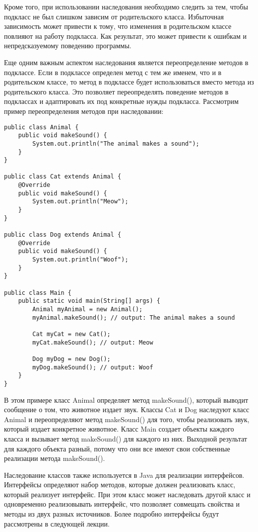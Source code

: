 \documentclass[12pt, a4paper]{book}%
\begin{document}
{Кроме того, при использовании наследования необходимо следить за тем, чтобы подкласс не был слишком зависим от родительского класса. Избыточная зависимость может привести к тому, что изменения в родительском классе повлияют на работу подкласса. Как результат, это может привести к ошибкам и непредсказуемому поведению программы.

Еще одним важным аспектом наследования является переопределение методов в подклассе. Если в подклассе определен метод с тем же именем, что и в родительском классе, то метод в подклассе будет использоваться вместо метода из родительского класса. Это позволяет переопределять поведение методов в подклассах и адаптировать их под конкретные нужды подкласса.
Рассмотрим пример переопределения методов при наследовании:

\begin{lstlisting}
public class Animal {
    public void makeSound() {
        System.out.println("The animal makes a sound");
    }
}

public class Cat extends Animal {
    @Override
    public void makeSound() {
        System.out.println("Meow");
    }
}

public class Dog extends Animal {
    @Override
    public void makeSound() {
        System.out.println("Woof");
    }
}

public class Main {
    public static void main(String[] args) {
        Animal myAnimal = new Animal();
        myAnimal.makeSound(); // output: The animal makes a sound

        Cat myCat = new Cat();
        myCat.makeSound(); // output: Meow

        Dog myDog = new Dog();
        myDog.makeSound(); // output: Woof
    }
}

\end{lstlisting}

В этом примере класс Animal определяет метод makeSound(), который выводит сообщение о том, что животное издает звук. Классы Cat и Dog наследуют класс Animal и переопределяют метод makeSound() для того, чтобы реализовать звук, который издает конкретное животное. Класс Main создает объекты каждого класса и вызывает метод makeSound() для каждого из них. Выходной результат для каждого объекта разный, потому что они все имеют свои собственные реализации метода makeSound().

Наследование классов также используется в Java для реализации интерфейсов. Интерфейсы определяют набор методов, которые должен реализовать класс, который реализует интерфейс. При этом класс может наследовать другой класс и одновременно реализовывать интерфейс, что позволяет совмещать свойства и методы из двух разных источников. Более подробно интерфейсы будут рассмотрены в следующей лекции.

}
\end{document}
